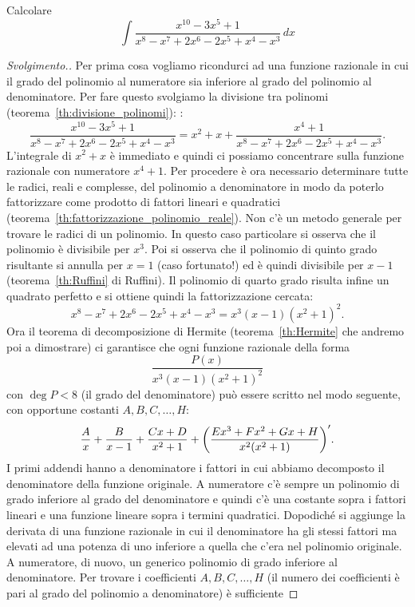 \begin{example}
  Calcolare
  \[
   \int \frac{x^{10}-3x^5+1}{x^8-x^7+2x^6-2x^5+x^4-x^3}\, dx
  \]
\end{example}
\begin{proof}[Svolgimento.]
Per prima cosa vogliamo ricondurci ad una funzione razionale
in cui il grado del polinomio al numeratore sia inferiore
al grado del polinomio al denominatore. Per fare questo svolgiamo
la divisione tra polinomi
(teorema~\ref{th:divisione_polinomi}):
:
\[
  \frac{x^{10}-3x^5+1}{x^8-x^7+2x^6-2x^5+x^4-x^3}
  = x^2 + x + \frac{x^4+1}{x^8-x^7+2x^6-2x^5+x^4-x^3}.
\]
L'integrale di $x^2+x$ è immediato e quindi ci possiamo concentrare
sulla funzione razionale con numeratore $x^4+1$.
Per procedere è ora necessario determinare tutte le radici, reali e complesse, del polinomio a denominatore in modo da poterlo fattorizzare
come prodotto di fattori lineari e quadratici
(teorema~\ref{th:fattorizzazione_polinomio_reale}).
Non c'è un metodo generale per trovare le radici di un polinomio.
In questo caso particolare si osserva
che il polinomio è divisibile per $x^3$. Poi si osserva che il polinomio
di quinto grado risultante si annulla per $x=1$ (caso fortunato!) ed
è quindi divisibile per $x-1$ (teorema~\ref{th:Ruffini} di Ruffini).
Il polinomio di quarto grado
risulta infine un quadrato perfetto e si ottiene quindi la fattorizzazione
cercata:
\[
x^8-x^7+2x^6-2x^5+x^4-x^3 = x^3(x-1)(x^2+1)^2.
\]
Ora il teorema di decomposizione di Hermite (teorema~\ref{th:Hermite} che andremo poi a dimostrare)
ci garantisce che ogni funzione razionale della forma
\[
\frac{P(x)}{x^3(x-1)(x^2+1)^2}
\]
con $\deg P < 8$ (il grado del denominatore) può essere
scritto nel modo seguente, con
opportune costanti $A,B,C,\dots,H$:
\begin{equation}\label{eq:438943}
  \frac{A}{x} + \frac{B}{x-1} + \frac{Cx+D}{x^2+1}
  + {\left( \frac{Ex^3 + Fx^2 + G x + H}{x^2(x^2+1)} \right)}'.
\end{equation}
I primi addendi hanno a denominatore i fattori in cui abbiamo
decomposto il denominatore della funzione originale. A numeratore
c'è sempre un polinomio di grado inferiore al grado del denominatore
e quindi c'è una costante sopra i fattori lineari e una funzione lineare
sopra i termini quadratici. Dopodiché si aggiunge la derivata di una funzione
razionale in cui il denominatore ha gli stessi fattori ma elevati ad una
potenza di uno inferiore a quella che c'era nel polinomio originale.
A numeratore, di nuovo, un generico polinomio di grado inferiore al denominatore.
Per trovare i coefficienti $A,B,C, \dots, H$ (il numero dei coefficienti è pari al grado del polinomio a denominatore) è sufficiente

\end{proof}
